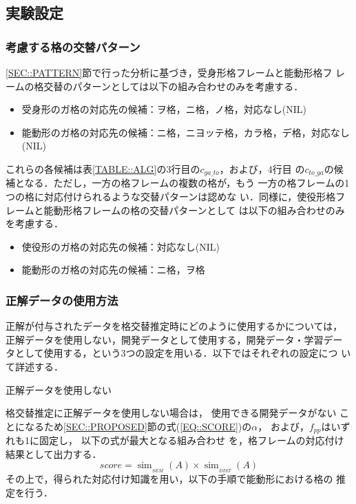 \documentclass[japanese]{jnlp_1.4}
\renewcommand{\paragraph}{}
\begin{document}
  \subsection{実験設定}

   \subsubsection{考慮する格の交替パターン}

   \ref{SEC::PATTERN}節で行った分析に基づき，受身形格フレームと能動形格フ
   レームの格交替のパターンとしては以下の組み合わせのみを考慮する．

   \begin{itemize}
    \item 受身形のガ格の対応先の候補：ヲ格，ニ格，ノ格，対応なし(NIL)
    \item 能動形のガ格の対応先の候補：ニ格，ニヨッテ格，カラ格，デ格，対応なし(NIL)
   \end{itemize}

   これらの各候補は表\ref{TABLE::ALG}の3行目の$c_\mathit{ga\_to}$，および，4行目
   の$c_{to\_ga}$の候補となる．ただし，一方の格フレームの複数の格が，もう
   一方の格フレームの1つの格に対応付けられるような交替パターンは認めな
   い．同様に，使役形格フレームと能動形格フレームの格の交替パターンとして
   は以下の組み合わせのみを考慮する．

   \begin{itemize}
    \item 使役形のガ格の対応先の候補：対応なし(NIL)
    \item 能動形のガ格の対応先の候補：ニ格，ヲ格
   \end{itemize}
   

   \subsubsection{正解データの使用方法}

   正解が付与されたデータを格交替推定時にどのように使用するかについては，
   正解データを使用しない，開発データとして使用する，開発データ・学習デー
   タとして使用する，という3つの設定を用いる．以下ではそれぞれの設定につ
   いて詳述する．

\paragraph{
正解データを使用しない}

    格交替推定に正解データを使用しない場合は，
使用できる開発データがない
    ことになるため\ref{SEC::PROPOSED}節の式(\ref{EQ::SCORE})の$\alpha$，
    および，$f_\mathit{pp}$はいずれも1に固定し，
以下の式が最大となる組み合わせ
    を，格フレームの対応付け結果として出力する．
\[
   \mathit{score} = \operatorname{sim}_{_\mathit{SEM}}(A)
	\times \operatorname{sim}_{_\mathit{DIST}}(A)
\]
    その上で，得られた対応付け知識を用い，以下の手順で能動形における格の
    推定を行う．
\end{document}

